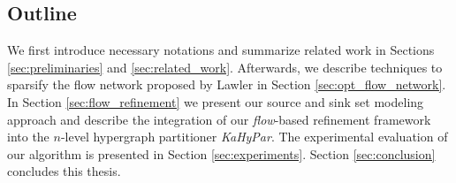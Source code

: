 \subsection{Outline}

We first introduce necessary notations and summarize related work in Sections \ref{sec:preliminaries}
and \ref{sec:related_work}. Afterwards, we describe techniques to sparsify the flow network
proposed by Lawler \cite{lawler1973} in Section \ref{sec:opt_flow_network}. In Section
\ref{sec:flow_refinement} we present our source and sink set modeling
approach and describe the integration of our \emph{flow}-based refinement framework into
the $n$-level hypergraph partitioner \emph{KaHyPar}. The experimental evaluation of our algorithm
is presented in Section \ref{sec:experiments}. Section \ref{sec:conclusion} concludes this thesis.